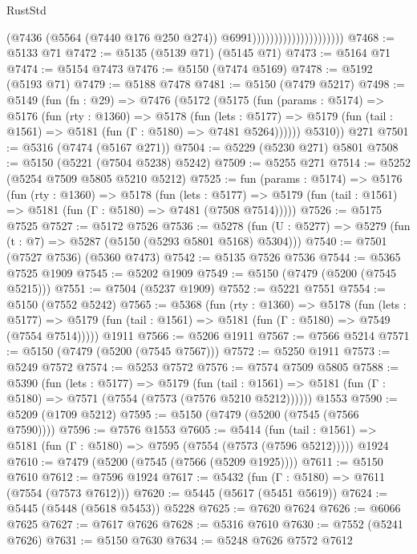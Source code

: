 \begin{lexlean}{RustStd}
\begin{coremodule}
                                            (@7436
                                              (@5564 (@7440 @176 @250 @274))
                                              @6991)))))))))))))))))))))
@7468 := @5133 @71
@7472 := @5135 (@5139 @71) (@5145 @71)
@7473 := @5164 @71
@7474 := @5154 @7473
@7476 := @5150 (@7474 @5169)
@7478 := @5192 (@5193 @71)
@7479 := @5188 @7478
@7481 := @5150 (@7479 @5217)
@7498 := @5149
    (fun (fn : @29) =>
    @7476
      (@5172
        (@5175
          (fun (params : @5174) =>
          @5176
            (fun (rty : @1360) =>
            @5178
              (fun (lets : @5177) =>
              @5179 (fun (tail : @1561) => @5181 (fun (Γ : @5180) => @7481 @5264))))))
        @5310))
    @271
@7501 := @5316 (@7474 (@5167 @271))
@7504 := @5229 (@5230 @271) @5801
@7508 := @5150 (@5221 (@7504 @5238) @5242)
@7509 := @5255 @271
@7514 := @5252 (@5254 @7509 @5805 @5210 @5212)
@7525 := fun (params : @5174) =>
  @5176
    (fun (rty : @1360) =>
    @5178
      (fun (lets : @5177) =>
      @5179 (fun (tail : @1561) => @5181 (fun (Γ : @5180) => @7481 (@7508 @7514)))))
@7526 := @5175 @7525
@7527 := @5172 @7526
@7536 := @5278 (fun (U : @5277) => @5279 (fun (t : @7) => @5287 (@5150 (@5293 @5801 @5168) @5304)))
@7540 := @7501 (@7527 @7536) (@5360 @7473)
@7542 := @5135 @7526 @7536
@7544 := @5365 @7525 @1909
@7545 := @5202 @1909
@7549 := @5150 (@7479 (@5200 (@7545 @5215)))
@7551 := @7504 (@5237 @1909)
@7552 := @5221 @7551
@7554 := @5150 (@7552 @5242)
@7565 := @5368
    (fun (rty : @1360) =>
    @5178
      (fun (lets : @5177) =>
      @5179 (fun (tail : @1561) => @5181 (fun (Γ : @5180) => @7549 (@7554 @7514)))))
    @1911
@7566 := @5206 @1911
@7567 := @7566 @5214
@7571 := @5150 (@7479 (@5200 (@7545 @7567)))
@7572 := @5250 @1911
@7573 := @5249 @7572
@7574 := @5253 @7572
@7576 := @7574 @7509 @5805
@7588 := @5390
    (fun (lets : @5177) =>
    @5179
      (fun (tail : @1561) => @5181 (fun (Γ : @5180) => @7571 (@7554 (@7573 (@7576 @5210 @5212))))))
    @1553
@7590 := @5209 (@1709 @5212)
@7595 := @5150 (@7479 (@5200 (@7545 (@7566 @7590))))
@7596 := @7576 @1553
@7605 := @5414
    (fun (tail : @1561) => @5181 (fun (Γ : @5180) => @7595 (@7554 (@7573 (@7596 @5212)))))
    @1924
@7610 := @7479 (@5200 (@7545 (@7566 (@5209 @1925))))
@7611 := @5150 @7610
@7612 := @7596 @1924
@7617 := @5432 (fun (Γ : @5180) => @7611 (@7554 (@7573 @7612)))
@7620 := @5445 (@5617 (@5451 @5619))
@7624 := @5445 (@5448 (@5618 @5453)) @5228
@7625 := @7620 @7624
@7626 := @6066 @7625
@7627 := @7617 @7626
@7628 := @5316 @7610
@7630 := @7552 (@5241 @7626)
@7631 := @5150 @7630
@7634 := @5248 @7626 @7572 @7612

\end{coremodule}
\end{lexlean}
